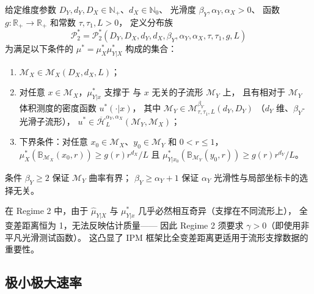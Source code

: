 \begin{Definition}\label{def:regime2}
    给定维度参数 $D_Y, d_Y, D_X \in \mathbb{N}_+$、$d_X \in \mathbb{N}_0$、
    光滑度 $\beta_Y, \alpha_Y, \alpha_X > 0$、
    函数 $g: \mathbb{R}_+ \to \mathbb{R}_+$ 和常数 $\tau, \tau_1, L > 0$，
    定义分布族
    \[
        \mathcal{P}_2^* = \mathcal{P}_2^*(D_Y, D_X, d_Y, d_X,
            \beta_Y, \alpha_Y, \alpha_X, \tau, \tau_1, g, L)
    \]
    为满足以下条件的 $\mu^* = \mu^*_X\mu^*_{Y|X}$ 构成的集合：
    \begin{enumerate}
        \item $\mathcal{M}_X \in \mathcal{M}_X(D_X, d_X, L)$；
        \item 对任意 $x \in \mathcal{M}_X$，$\mu^*_{Y|x}$ 支撑于
              与 $x$ 无关的子流形 $\mathcal{M}_Y$ 上，
              且有相对于 $\mathcal{M}_Y$ 体积测度的密度函数
              $u^*(\cdot|x)$，
              其中 $\mathcal{M}_Y \in \mathcal{M}_{\tau,\tau_1,L}^{\beta_Y}(d_Y, D_Y)$
             （$d_Y$ 维、$\beta_Y$-光滑子流形），
              $u^* \in \overline{\mathcal{H}}_L^{\alpha_Y, \alpha_X}
                 (\mathcal{M}_Y, \mathcal{M}_X)$；
        \item 下界条件：对任意 $x_0 \in \mathcal{M}_X$、$y_0 \in \mathcal{M}_Y$
              和 $0 < r \leq 1$，
              $\mu^*_X(\mathbb{B}_{\mathcal{M}_X}(x_0, r)) \geq g(r)r^{d_X}/L$
              且 $\mu^*_{Y|x_0}(\mathbb{B}_{\mathcal{M}_Y}(y_0, r))
                 \geq g(r)r^{d_Y}/L$。
    \end{enumerate}
\end{Definition}

条件 $\beta_Y \geq 2$ 保证 $\mathcal{M}_Y$ 曲率有界；
$\beta_Y \geq \alpha_Y + 1$ 保证 $\alpha_Y$ 光滑性与局部坐标卡的选择无关。

\begin{Remark}\label{rem:TV-fail}
    在 Regime 2 中，由于 $\widehat{\mu}_{Y|X}$ 与 $\mu^*_{Y|x}$
    几乎必然相互奇异（支撑在不同流形上），
    全变差距离恒为 1，无法反映估计质量——
    因此 Regime 2 须要求 $\gamma > 0$（即使用非平凡光滑测试函数）。
    这凸显了 IPM 框架比全变差距离更适用于流形支撑数据的重要性。
\end{Remark}

\subsection{极小极大速率}\label{sec:ch2-regime2-rate}


